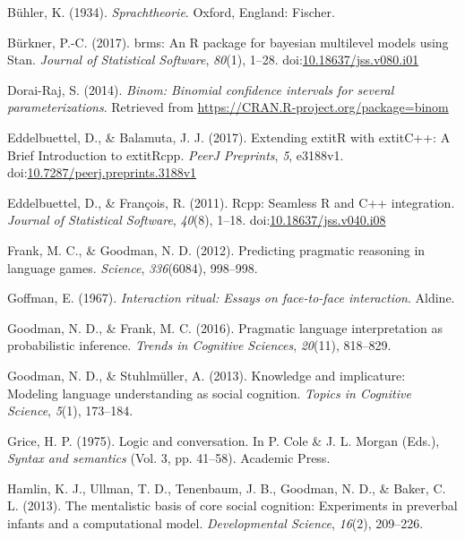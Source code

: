 \documentclass[floatsintext,man]{apa6}
\theoremstyle{definition}
\theoremstyle{definition}
\theoremstyle{definition}
\theoremstyle{remark}
\begin{document}
\hypertarget{ref-buhler1934}{}
Bühler, K. (1934). \emph{Sprachtheorie}. Oxford, England: Fischer.

\hypertarget{ref-R-brms}{}
Bürkner, P.-C. (2017). brms: An R package for bayesian multilevel models
using Stan. \emph{Journal of Statistical Software}, \emph{80}(1), 1--28.
doi:\href{https://doi.org/10.18637/jss.v080.i01}{10.18637/jss.v080.i01}

\hypertarget{ref-R-binom}{}
Dorai-Raj, S. (2014). \emph{Binom: Binomial confidence intervals for
several parameterizations}. Retrieved from
\url{https://CRAN.R-project.org/package=binom}

\hypertarget{ref-R-Rcpp_b}{}
Eddelbuettel, D., \& Balamuta, J. J. (2017). Extending extitR with
extitC++: A Brief Introduction to extitRcpp. \emph{PeerJ Preprints},
\emph{5}, e3188v1.
doi:\href{https://doi.org/10.7287/peerj.preprints.3188v1}{10.7287/peerj.preprints.3188v1}

\hypertarget{ref-R-Rcpp_a}{}
Eddelbuettel, D., \& François, R. (2011). Rcpp: Seamless R and C++
integration. \emph{Journal of Statistical Software}, \emph{40}(8),
1--18.
doi:\href{https://doi.org/10.18637/jss.v040.i08}{10.18637/jss.v040.i08}

\hypertarget{ref-frank2012}{}
Frank, M. C., \& Goodman, N. D. (2012). Predicting pragmatic reasoning
in language games. \emph{Science}, \emph{336}(6084), 998--998.

\hypertarget{ref-goffman1967}{}
Goffman, E. (1967). \emph{Interaction ritual: Essays on face-to-face
interaction}. Aldine.

\hypertarget{ref-goodman2016}{}
Goodman, N. D., \& Frank, M. C. (2016). Pragmatic language
interpretation as probabilistic inference. \emph{Trends in Cognitive
Sciences}, \emph{20}(11), 818--829.

\hypertarget{ref-goodman2013}{}
Goodman, N. D., \& Stuhlmüller, A. (2013). Knowledge and implicature:
Modeling language understanding as social cognition. \emph{Topics in
Cognitive Science}, \emph{5}(1), 173--184.

\hypertarget{ref-grice1975}{}
Grice, H. P. (1975). Logic and conversation. In P. Cole \& J. L. Morgan
(Eds.), \emph{Syntax and semantics} (Vol. 3, pp. 41--58). Academic
Press.

\hypertarget{ref-hamlin2013mentalistic}{}
Hamlin, K. J., Ullman, T. D., Tenenbaum, J. B., Goodman, N. D., \&
Baker, C. L. (2013). The mentalistic basis of core social cognition:
Experiments in preverbal infants and a computational model.
\emph{Developmental Science}, \emph{16}(2), 209--226.
\end{document}
